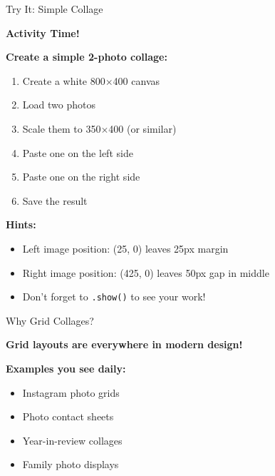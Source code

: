 \documentclass{csbeamer}
\begin{document}
\begin{frame}[fragile]{Try It: Simple Collage}
    \begin{center}
        \Large \textbf{Activity Time!}
    \end{center}

    \vspace{1em}

    \textbf{Create a simple 2-photo collage:}
    \begin{enumerate}
        \item Create a white 800$\times$400 canvas
        \item Load two photos
        \item Scale them to 350$\times$400 (or similar)
        \item Paste one on the left side
        \item Paste one on the right side
        \item Save the result
    \end{enumerate}

    \vspace{1em}

    \textbf{Hints:}
    \begin{itemize}
        \item Left image position: (25, 0) leaves 25px margin
        \item Right image position: (425, 0) leaves 50px gap in middle
        \item Don't forget to \texttt{.show()} to see your work!
    \end{itemize}
\end{frame}

\begin{frame}{Why Grid Collages?}
    \begin{center}
        \textbf{Grid layouts are everywhere in modern design!}
    \end{center}

    \vspace{1em}

    \textbf{Examples you see daily:}
    \begin{itemize}
        \item Instagram photo grids
        \item Photo contact sheets
        \item Year-in-review collages
        \item Family photo displays
    \end{itemize}
\end{frame}
\end{document}
